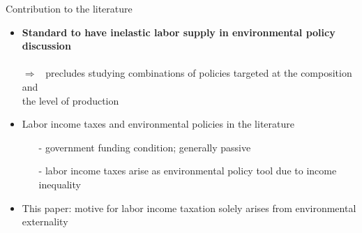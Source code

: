 \documentclass[11pt,aspectratio=169]{beamer}
\newcommand{\ar}{$\Rightarrow$ \ }
\begin{document}
\begin{frame}{Contribution to the literature}
	\begin{itemize}[<+->]
		\item \alert{\textbf{Standard to have inelastic labor supply in environmental policy discussion}}\\  \footnotesize{ \citep{Acemoglu2012TheChange, Golosov2014OptimalEquilibrium, Acemoglu2016TransitionTechnology, Fried2018ClimateAnalysis, Hart2019TheEconomists}}
		\\  \normalsize{\alert{\ar precludes studying combinations of policies targeted at the composition and\\ \hspace{5mm} the level of production }}
		\vspace{2mm}
		\item \alert{Labor income taxes and environmental policies in the literature}
		\begin{itemize}
			\item[-]  government funding condition; generally passive \footnotesize{ \citep{ LansBovenberg1994EnvironmentalTaxation, Goulder1995EnvironmentalGuide, Barrage2019OptimalPolicy}} %
			\item[-] labor income taxes arise as environmental policy tool due to {income inequality} \footnotesize{\citep{Jacobs2019RedistributionCurves, Dobkowitz2022, Douenne2022OptimalHouseholds}}
		\end{itemize}		
		\vspace{2mm}
		\item \alert{This paper}: motive for labor income taxation solely arises from environmental externality %

\end{itemize}
\end{frame}
\end{document}
